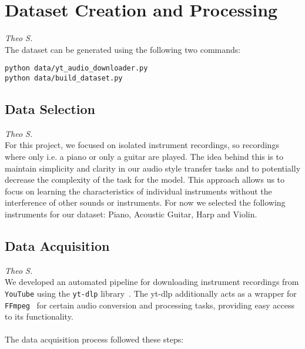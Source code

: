 \section{Dataset Creation and Processing}
\textit{Theo S.}\\
The dataset can be generated using the following two commands:

\begin{lstlisting}[caption={Generating the dataset}]
python data/yt_audio_downloader.py
python data/build_dataset.py
\end{lstlisting}

\subsection{Data Selection}
\textit{Theo S.}\\
For this project, we focused on isolated instrument recordings, so recordings where only i.e. a piano or only a guitar are played.
The idea behind this is to maintain simplicity and clarity in our audio style transfer tasks and to potentially decrease the complexity of the task for the model.
This approach allows us to focus on learning the characteristics of individual instruments without the interference of other sounds or instruments.
For now we selected the following instruments for our dataset: Piano, Acoustic Guitar, Harp and Violin.


\subsection{Data Acquisition}
\label{sec:data_acquisition}
\textit{Theo S.}\\
We developed an automated pipeline for downloading instrument recordings from \texttt{YouTube} using the \texttt{yt-dlp} library~\cite{youtube,yt-dlp}.
The yt-dlp additionally acts as a wrapper for \texttt{FFmpeg}~\cite{ffmpeg} for certain audio conversion and processing tasks, providing easy access to its functionality.
\\\\
The data acquisition process followed these steps:

